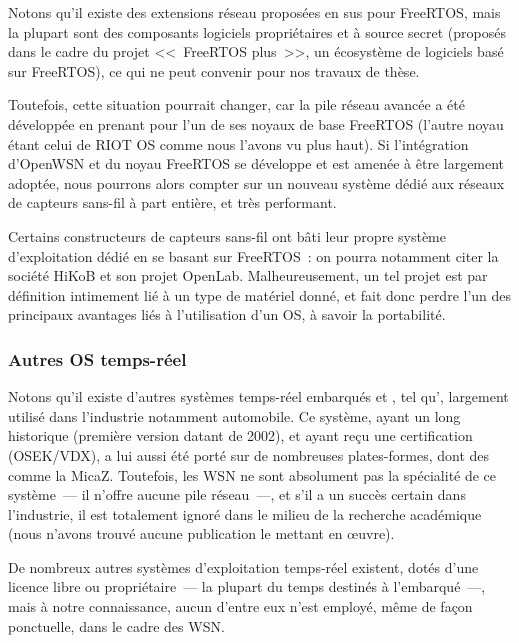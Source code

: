 Notons qu'il existe des extensions réseau proposées en sus pour FreeRTOS,
mais la plupart sont des composants logiciels propriétaires et à source
secret (proposés dans le cadre du projet <<~FreeRTOS plus~>>, un écosystème
de logiciels basé sur FreeRTOS), ce qui ne peut convenir pour nos
travaux de thèse.

Toutefois, cette situation pourrait changer, car la pile réseau avancée
 \cite{OpenWSN} a été développée en prenant pour l'un de ses
noyaux de base FreeRTOS (l'autre noyau étant celui de RIOT OS comme nous
l'avons vu plus haut). Si l'intégration d'OpenWSN et du noyau FreeRTOS
se développe et est amenée à être largement adoptée, nous pourrons alors
compter sur un nouveau système dédié aux réseaux de capteurs sans-fil
à part entière,  et très performant.

\bigskip

Certains constructeurs de capteurs sans-fil ont bâti leur propre système
d'exploitation dédié en se basant sur FreeRTOS~: on pourra notamment citer
la société HiKoB et son projet OpenLab. Malheureusement, un tel projet est
par définition intimement lié à un type de matériel donné, et fait donc
perdre l'un des principaux avantages liés à l'utilisation d'un OS,
à savoir la portabilité.

\subsubsection{Autres OS temps-réel}
\label{SubsecAutresRTOS}

Notons qu'il existe d'autres systèmes temps-réel embarqués et , tel qu', largement utilisé dans l'industrie
notamment automobile. Ce système, ayant un long historique (première
version datant de 2002), et ayant reçu une certification (OSEK/VDX),
a lui aussi été porté sur de nombreuses plates-formes, dont des 
comme la MicaZ. Toutefois, les WSN ne sont absolument pas la spécialité
de ce système~--- il n'offre aucune pile réseau~---, et s'il a un succès
certain dans l'industrie, il est totalement ignoré dans le milieu de
la recherche académique (nous n'avons trouvé aucune publication le
mettant en {\oe}uvre).

De nombreux autres systèmes d'exploitation temps-réel existent, dotés
d'une licence libre ou propriétaire~--- la plupart du temps destinés
à l'embarqué~---, mais à notre connaissance, aucun d'entre eux n'est
employé, même de façon ponctuelle, dans le cadre des WSN.

